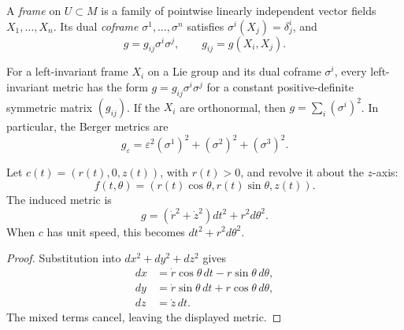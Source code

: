 \begin{definition}
  \label{def:pet-ch1-frame-metric}
  \leanok
  A \emph{frame} on $U\subset M$ is a family of pointwise linearly independent
  vector fields $X_1,\ldots,X_n$. Its dual \emph{coframe}
  $\sigma^1,\ldots,\sigma^n$ satisfies $\sigma^i(X_j)=\delta^i_j$, and
  \[
    g=g_{ij}\sigma^i\sigma^j,
    \qquad g_{ij}=g(X_i,X_j).
  \]
\end{definition}

\begin{example}
  \label{ex:pet-ch1-left-invariant-coframe}
  \leanok
  For a left-invariant frame $X_i$ on a Lie group and its dual coframe
  $\sigma^i$, every left-invariant metric has the form
  $g=g_{ij}\sigma^i\sigma^j$ for a constant positive-definite symmetric matrix
  $(g_{ij})$. If the $X_i$ are orthonormal, then
  $g=\sum_i(\sigma^i)^2$. In particular, the Berger metrics are
  \[
    g_\varepsilon=\varepsilon^2(\sigma^1)^2
      +(\sigma^2)^2+(\sigma^3)^2.
  \]
\end{example}

\begin{example}
  \label{ex:pet-ch1-surface-of-revolution}
  \leanok
  Let $c(t)=(r(t),0,z(t))$, with $r(t)>0$, and revolve it about the $z$-axis:
  \[
    f(t,\theta)=(r(t)\cos\theta,r(t)\sin\theta,z(t)).
  \]
  The induced metric is
  \[
    g=(\dot r^2+\dot z^2)dt^2+r^2d\theta^2.
  \]
  When $c$ has unit speed, this becomes $dt^2+r^2d\theta^2$.
\end{example}
\begin{proof}
  \leanok
  \sketch
  Substitution into $dx^2+dy^2+dz^2$ gives
  \[
  \begin{aligned}
    dx&=\dot r\cos\theta\,dt-r\sin\theta\,d\theta,\\
    dy&=\dot r\sin\theta\,dt+r\cos\theta\,d\theta,\\
    dz&=\dot z\,dt.
  \end{aligned}
  \]
  The mixed terms cancel, leaving the displayed metric.
\end{proof}

